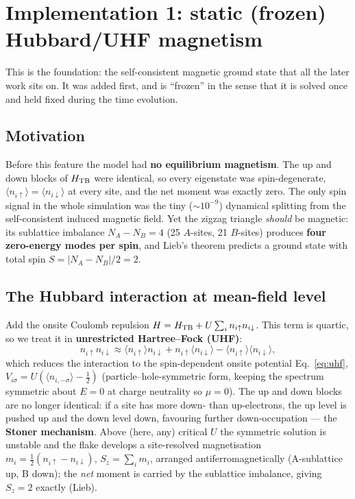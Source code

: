 \documentclass[11pt]{article}
\begin{document}
\section{Implementation 1: static (frozen) Hubbard/UHF magnetism}
\label{sec:frozen}
This is the foundation: the self-consistent magnetic ground state that all the
later work sits on. It was added first, and is ``frozen'' in the sense that it
is solved once and held fixed during the time evolution.

\subsection{Motivation}
Before this feature the model had \textbf{no equilibrium magnetism}. The up and
down blocks of $H_{\rm TB}$ were identical, so every eigenstate was
spin-degenerate, $\langle n_{i\uparrow}\rangle=\langle n_{i\downarrow}\rangle$
at every site, and the net moment was exactly zero. The only spin signal in the
whole simulation was the tiny ($\sim10^{-9}$) dynamical splitting from the
self-consistent induced magnetic field. Yet the zigzag triangle \emph{should} be
magnetic: its sublattice imbalance $N_A-N_B=4$ (25 $A$-sites, 21 $B$-sites)
produces \textbf{four zero-energy modes per spin}, and Lieb's theorem predicts a
ground state with total spin $S=|N_A-N_B|/2=2$.

\subsection{The Hubbard interaction at mean-field level}
Add the onsite Coulomb repulsion
$H=H_{\rm TB}+U\sum_i n_{i\uparrow}n_{i\downarrow}$. This term is quartic, so we
treat it in \textbf{unrestricted Hartree--Fock (UHF)}:
\begin{equation}
n_{i\uparrow}n_{i\downarrow}\approx
\langle n_{i\uparrow}\rangle n_{i\downarrow}
+ n_{i\uparrow}\langle n_{i\downarrow}\rangle
- \langle n_{i\uparrow}\rangle\langle n_{i\downarrow}\rangle,
\end{equation}
which reduces the interaction to the spin-dependent onsite potential
Eq.~\eqref{eq:uhf}, $V_{i\sigma}=U(\langle n_{i,-\sigma}\rangle-\tfrac12)$
(particle--hole-symmetric form, keeping the spectrum symmetric about $E=0$ at
charge neutrality so $\mu=0$). The up and down blocks are no longer identical:
if a site has more down- than up-electrons, the up level is pushed up and the
down level down, favouring further down-occupation --- the \textbf{Stoner
mechanism}. Above (here, any) critical $U$ the symmetric solution is unstable
and the flake develops a site-resolved magnetisation
$m_i=\tfrac12(n_{i\uparrow}-n_{i\downarrow})$, $S_z=\sum_i m_i$, arranged
antiferromagnetically (A-sublattice up, B down); the \emph{net} moment is carried
by the sublattice imbalance, giving $S_z=2$ exactly (Lieb).
\end{document}
